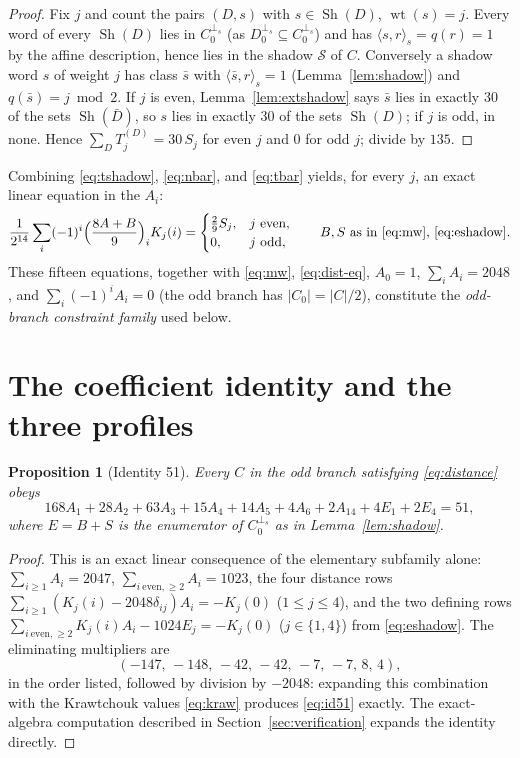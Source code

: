 \documentclass[11pt]{amsart}
\newtheorem{proposition}[theorem]{Proposition}
\theoremstyle{definition}
\theoremstyle{remark}
\DeclareMathOperator{\wt}{wt}
\DeclareMathOperator{\Sh}{Sh}
\newcommand{\perps}{{\perp_s}}
\newcommand{\sform}[2]{\langle #1,#2\rangle_s}
\begin{document}
\begin{proof}
Fix $j$ and count the pairs $(D,s)$ with $s\in\Sh(D)$, $\wt(s)=j$.  Every
word of every $\Sh(D)$ lies in $C_0^{\perps}$ (as
$D_0^{\perps}\subseteq C_0^{\perps}$) and has
$\sform{s}{r}=q(r)=1$ by the affine description, hence lies in the shadow
$\mathcal S$ of $C$.  Conversely a shadow word $s$ of weight $j$ has class
$\bar s$ with $\sform{\bar s}{r}=1$ (Lemma~\ref{lem:shadow}) and
$q(\bar s)=j\bmod 2$.  If $j$ is even, Lemma~\ref{lem:extshadow} says
$\bar s$ lies in exactly $30$ of the sets $\Sh(\bar D)$, so $s$ lies in
exactly $30$ of the sets $\Sh(D)$; if $j$ is odd, in none.  Hence
$\sum_DT^{(D)}_j=30\,S_j$ for even $j$ and $0$ for odd $j$; divide by
$135$.
\end{proof}

Combining \eqref{eq:tshadow}, \eqref{eq:nbar}, and \eqref{eq:tbar} yields,
for every $j$, an exact linear equation in the $A_i$:
\begin{equation}\label{eq:family}
\frac{1}{2^{14}}\sum_i(-1)^i\Bigl(\frac{8A+B}{9}\Bigr)_iK_j(i)
=\begin{cases}\frac{2}{9}S_j,& j\ \text{even},\\ 0,& j\ \text{odd},\end{cases}
\qquad B,S\ \text{as in \eqref{eq:mw}, \eqref{eq:eshadow}}.
\end{equation}
These fifteen equations, together with \eqref{eq:mw},
\eqref{eq:dist-eq}, $A_0=1$, $\sum_iA_i=2048$, and
$\sum_i(-1)^iA_i=0$ (the odd branch has $|C_0|=|C|/2$), constitute the
\emph{odd-branch constraint family} used below.

\section{The coefficient identity and the three profiles}
\label{sec:profiles}

\begin{proposition}[Identity 51]\label{prop:id51}
Every $C$ in the odd branch satisfying \eqref{eq:distance} obeys
\begin{equation}\label{eq:id51}
168A_1+28A_2+63A_3+15A_4+14A_5+4A_6+2A_{14}+4E_1+2E_4=51 ,
\end{equation}
where $E=B+S$ is the enumerator of $C_0^{\perps}$ as in
Lemma~\ref{lem:shadow}.
\end{proposition}

\begin{proof}
This is an exact linear consequence of the elementary subfamily alone:
$\sum_{i\ge1}A_i=2047$, $\sum_{i\ \mathrm{even},\ge2}A_i=1023$, the four
distance rows $\sum_{i\ge1}(K_j(i)-2048\delta_{ij})A_i=-K_j(0)$
($1\le j\le4$), and the two defining rows
$\sum_{i\ \mathrm{even},\ge2}K_j(i)A_i-1024E_j=-K_j(0)$ ($j\in\{1,4\}$)
from \eqref{eq:eshadow}.  The eliminating multipliers are
\[
(-147,\,-148,\,-42,\,-42,\,-7,\,-7,\,8,\,4),
\]
in the order listed, followed by division by $-2048$: expanding this
combination with the Krawtchouk values \eqref{eq:kraw} produces
\eqref{eq:id51} exactly.  The exact-algebra computation described in
Section~\ref{sec:verification} expands the identity directly.
\end{proof}
\end{document}
